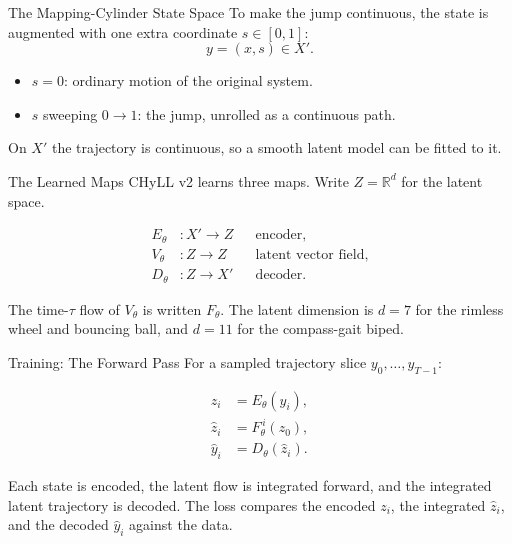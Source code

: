 \documentclass[10pt,aspectratio=169]{beamer}
\begin{document}
\begin{frame}{The Mapping-Cylinder State Space}
  To make the jump continuous, the state is augmented with one extra
  coordinate \(s \in [0,1]\):
  \[
    y = (x, s) \in X'.
  \]

  \begin{itemize}
    \item \(s = 0\): ordinary motion of the original system.
    \item \(s\) sweeping \(0 \to 1\): the jump, unrolled as a continuous path.
  \end{itemize}

  \vspace{0.6em}
  On \(X'\) the trajectory is continuous, so a smooth latent model can be fitted
  to it.
\end{frame}

\begin{frame}{The Learned Maps}
  CHyLL v2 learns three maps. Write \(Z = \mathbb{R}^d\) for the latent space.

  \vspace{0.6em}
  \begin{align*}
    E_\theta &: X' \to Z && \text{encoder},\\
    V_\theta &: Z \to Z && \text{latent vector field},\\
    D_\theta &: Z \to X' && \text{decoder}.
  \end{align*}

  \vspace{0.4em}
  The time-\(\tau\) flow of \(V_\theta\) is written \(F_\theta\). The latent
  dimension is \(d = 7\) for the rimless wheel and bouncing ball, and
  \(d = 11\) for the compass-gait biped.
\end{frame}

\begin{frame}{Training: The Forward Pass}
  For a sampled trajectory slice \(y_0, \ldots, y_{T-1}\):

  \vspace{0.5em}
  \begin{align*}
    z_i &= E_\theta(y_i),\\
    \widehat z_i &= F_\theta^{\,i}(z_0),\\
    \widehat y_i &= D_\theta(\widehat z_i).
  \end{align*}

  \vspace{0.4em}
  Each state is encoded, the latent flow is integrated forward, and the
  integrated latent trajectory is decoded. The loss compares the encoded
  \(z_i\), the integrated \(\widehat z_i\), and the decoded \(\widehat y_i\)
  against the data.
\end{frame}
\end{document}
